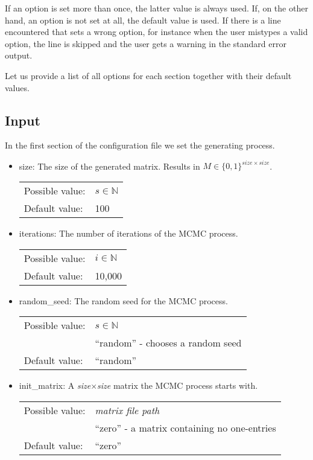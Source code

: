 If an option is set more than once, the latter value is always used. If, on the other hand, an option is not set at all, the default value is used. If there is a line encountered that sets a wrong option, for instance when the user mistypes a valid option, the line is skipped and the user gets a warning in the standard error output.

Let us provide a list of all options for each section together with their default values.

\subsection{Input}
In the first section of the configuration file we set the generating process.
\begin{itemize}
\item size: The size of the generated matrix. Results in $M\in\{0,1\}^{size\times size}$.

\begin{tabular}{ll}
Possible value: & $s\in\mathbb{N}$ \\
Default value: & 100
\end{tabular}

\item iterations: The number of iterations of the MCMC process.

\begin{tabular}{ll}
Possible value: & $i\in\mathbb{N}$ \\
Default value: & 10,000
\end{tabular}

\item random\_seed: The random seed for the MCMC process.

\begin{tabular}{ll}
Possible value: & $s\in\mathbb{N}$ \\
& ``random'' - chooses a random seed \\
Default value: & ``random''
\end{tabular}

\item init\_matrix: A \textit{size}$\times$\textit{size} matrix the MCMC process starts with.

\begin{tabular}{ll}
Possible value: & \textit{matrix file path} \\
& ``zero'' - a matrix containing no one-entries \\
Default value: & ``zero''
\end{tabular}


\end{itemize}
